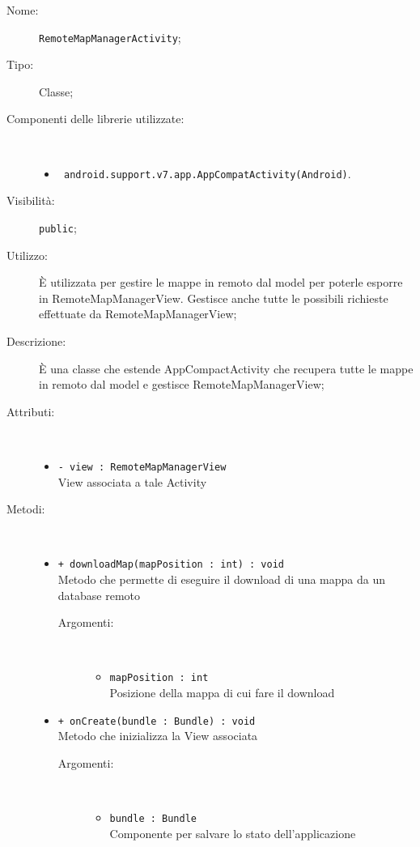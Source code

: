 \documentclass[../DefinizioneDiProdotto.tex]{subfiles}
\begin{document}
    \begin{description}
\item[Nome:] \texttt{RemoteMapManagerActivity};
\item[Tipo:] Classe;
\item[Componenti delle librerie utilizzate:] \
\begin{itemize}
\item \texttt{ android.support.v7.app.AppCompatActivity(Android)}.

\end{itemize}
\item[Visibilità:] \texttt{public};
\item[Utilizzo:] È utilizzata per gestire le mappe in remoto dal model per poterle esporre in RemoteMapManagerView. Gestisce anche tutte le possibili richieste effettuate da RemoteMapManagerView;
\item[Descrizione:] È una classe che estende AppCompactActivity che recupera tutte le mappe in remoto dal model e gestisce RemoteMapManagerView;
\item[Attributi:] \
\begin{itemize}
\item \texttt{- view : RemoteMapManagerView}\\
View associata a tale Activity

\end{itemize}
\item[Metodi:] \
\begin{itemize}
\item \texttt{+ downloadMap(mapPosition : int) : void}\\
Metodo che permette di eseguire il download di una mappa da un database remoto
 \begin{description}
\item[Argomenti:] \
\begin{itemize}
\item \texttt{mapPosition : int}\\
Posizione della mappa di cui fare il download\end{itemize}
\end{description}
\item \texttt{+ onCreate(bundle : Bundle) : void}\\
Metodo che inizializza la View associata
 \begin{description}
\item[Argomenti:] \
\begin{itemize}
\item \texttt{bundle : Bundle}\\
Componente per salvare lo stato dell'applicazione\end{itemize}
\end{description}
\end{itemize}
\end{description}
\end{document}
